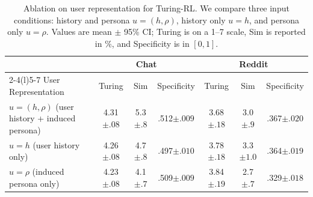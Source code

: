 \documentclass{article} %
\newcommand{\subtle}[1]{{\tiny\color[gray]{0.4}#1}}
\begin{document}



\begin{table}[t]
\centering
\small
\setlength{\tabcolsep}{2.0pt}
\begin{tabular*}{\columnwidth}{@{\extracolsep{\fill}}lcccccc@{}}
\toprule
\multirow{2}{*}{} & \multicolumn{3}{c}{Chat} & \multicolumn{3}{c}{Reddit} \\
\cmidrule(lr){2-4}\cmidrule(l){5-7}
User Representation & Turing & Sim & Specificity & Turing & Sim & Specificity \\
\midrule
$u = (h, \rho)$ (user history + induced persona) & 4.31\subtle{$\pm .08$} & 5.3\subtle{$\pm .8$} & .512\subtle{$\pm .009$} & {3.68}\subtle{$\pm .18$} & 3.0\subtle{$\pm .9$} & .367\subtle{$\pm .020$} \\
$u = h$ (user history only)      & 4.26\subtle{$\pm .08$} & 4.7\subtle{$\pm .8$} & {.497}\subtle{$\pm .010$} & 3.78\subtle{$\pm .18$} & 3.3\subtle{$\pm 1.0$} & .364\subtle{$\pm .019$} \\
 $u = \rho$ (induced persona only)    & {4.23}\subtle{$\pm .08$} & {4.1}\subtle{$\pm .7$} & .509\subtle{$\pm .009$} & 3.84\subtle{$\pm .19$} & {2.7}\subtle{$\pm .7$} & {.329}\subtle{$\pm .018$} \\
\bottomrule
\end{tabular*}
\vspace{-0.3cm}
\caption{Ablation on user representation for Turing-RL. We compare three input conditions: history and persona $u = (h, \rho)$, history only $u = h$, and persona only $u = \rho$.  Values are mean $\pm$ 95\% CI; Turing is on a 1--7 scale, Sim is reported in \%, and Specificity is in $[0,1]$.}
\label{tab:ablation_combined}
\end{table}
\end{document}
